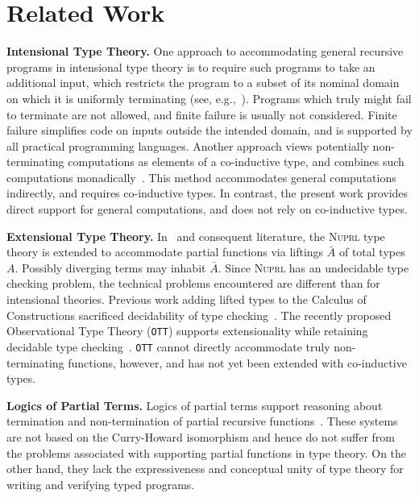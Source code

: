 \documentclass[preprint,natbib]{sigplanconf}
\begin{document}
\section{Related Work}

\textbf{Intensional Type Theory.} One approach to accommodating
general recursive programs in intensional type theory is to require
such programs to take an additional input, which restricts the program
to a subset of its nominal domain on which it is uniformly terminating
(see, e.g.,~\cite{bove+05}).  Programs which truly might fail to
terminate are not allowed, and finite failure is usually not
considered.  Finite failure simplifies code on inputs outside the
intended domain, and is supported by all practical programming
languages.  Another approach views potentially non-terminating
computations as elements of a co-inductive type, and combines such
computations monadically~\cite{capretta05}.  This method accommodates
general computations indirectly, and requires co-inductive types.  In
contrast, the present work provides direct support for general
computations, and does not rely on co-inductive types.

\textbf{Extensional Type Theory.} In~\cite{constable+89} and
consequent literature, the \textsc{Nuprl} type theory is extended to
accommodate partial functions via liftings $\bar{A}$ of total types
$A$.  Possibly diverging terms may inhabit $\bar{A}$.  Since
\textsc{Nuprl} has an undecidable type checking problem, the technical
problems encountered are different than for intensional theories.
Previous work adding lifted types to the Calculus of Constructions
sacrificed decidability of type checking~\cite{audebaud91}.  The
recently proposed Observational Type Theory (\texttt{OTT}) supports
extensionality while retaining decidable type
checking~\cite{altenkirch+07}.  \texttt{OTT} cannot directly
accommodate truly non-terminating functions, however, and has not yet
been extended with co-inductive types.

\textbf{Logics of Partial Terms.} Logics of partial terms support
reasoning about termination and non-termination of partial recursive
functions~\cite{stark98,B85}.  These systems are not based on the
Curry-Howard isomorphism and hence do not suffer from the problems
associated with supporting partial functions in type theory.  On the
other hand, they lack the expressiveness and conceptual unity of type
theory for writing and verifying typed programs.
\end{document}

